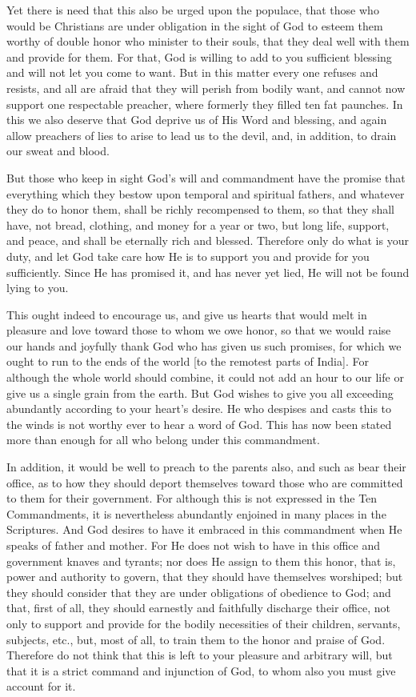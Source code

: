 Yet there is need that this also be urged upon the populace, that
those who would be Christians are under obligation in the sight of God
to esteem them worthy of double honor who minister to their souls, that
they deal well with them and provide for them. For that, God is willing
to add to you sufficient blessing and will not let you come to want.
But in this matter every one refuses and resists, and all are afraid
that they will perish from bodily want, and cannot now support one
respectable preacher, where formerly they filled ten fat paunches. In
this we also deserve that God deprive us of His Word and blessing, and
again allow preachers of lies to arise to lead us to the devil, and, in
addition, to drain our sweat and blood.

But those who keep in sight God's will and commandment have the
promise that everything which they bestow upon temporal and spiritual
fathers, and whatever they do to honor them, shall be richly
recompensed to them, so that they shall have, not bread, clothing, and
money for a year or two, but long life, support, and peace, and shall
be eternally rich and blessed. Therefore only do what is your duty, and
let God take care how He is to support you and provide for you
sufficiently. Since He has promised it, and has never yet lied, He will
not be found lying to you.

This ought indeed to encourage us, and give us hearts that would melt
in pleasure and love toward those to whom we owe honor, so that we
would raise our hands and joyfully thank God who has given us such
promises, for which we ought to run to the ends of the world [to the
remotest parts of India]. For although the whole world should combine,
it could not add an hour to our life or give us a single grain from the
earth. But God wishes to give you all exceeding abundantly according to
your heart's desire. He who despises and casts this to the winds is not
worthy ever to hear a word of God. This has now been stated more than
enough for all who belong under this commandment.

In addition, it would be well to preach to the parents also, and such
as bear their office, as to how they should deport themselves toward
those who are committed to them for their government. For although this
is not expressed in the Ten Commandments, it is nevertheless abundantly
enjoined in many places in the Scriptures. And God desires to have it
embraced in this commandment when He speaks of father and mother. For
He does not wish to have in this office and government knaves and
tyrants; nor does He assign to them this honor, that is, power and
authority to govern, that they should have themselves worshiped; but
they should consider that they are under obligations of obedience to
God; and that, first of all, they should earnestly and faithfully
discharge their office, not only to support and provide for the bodily
necessities of their children, servants, subjects, etc., but, most of
all, to train them to the honor and praise of God. Therefore do not
think that this is left to your pleasure and arbitrary will, but that
it is a strict command and injunction of God, to whom also you must
give account for it.

